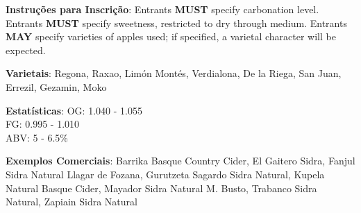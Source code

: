 \textbf{Instruções para Inscrição}: Entrants \textbf{MUST} specify carbonation level. Entrants \textbf{MUST} specify sweetness, restricted to dry through medium. Entrants \textbf{MAY} specify varieties of apples used; if specified, a varietal character will be expected.

\textbf{Varietais}: Regona, Raxao, Limón Montés, Verdialona, De la Riega, San Juan, Errezil, Gezamin, Moko

\textbf{Estatísticas}: OG: 1.040 - 1.055 \\
\phantom{ } \hspace{16.5mm} FG: 0.995 - 1.010 \\
\phantom{ } \hspace{16.5mm} ABV: 5 - 6.5\%

\textbf{Exemplos Comerciais}: Barrika Basque Country Cider, El Gaitero Sidra, Fanjul Sidra Natural Llagar de Fozana, Gurutzeta Sagardo Sidra Natural, Kupela Natural Basque Cider, Mayador Sidra Natural M. Busto, Trabanco Sidra Natural, Zapiain Sidra Natural